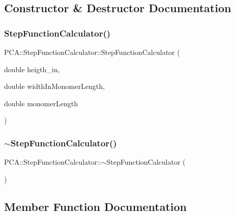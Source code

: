 \subsection{Constructor \& Destructor Documentation}
\hypertarget{class_p_c_a_1_1_step_function_calculator_a9bf57193b40bb2b8a33fd5a5878b0b2a}{}\label{class_p_c_a_1_1_step_function_calculator_a9bf57193b40bb2b8a33fd5a5878b0b2a} 
\subsubsection{\texorpdfstring{Step\+Function\+Calculator()}{StepFunctionCalculator()}}
{\footnotesize\ttfamily P\+C\+A\+::\+Step\+Function\+Calculator\+::\+Step\+Function\+Calculator (\begin{DoxyParamCaption}\item[{double}]{heigth\+\_\+in,  }\item[{double}]{width\+In\+Monomer\+Length,  }\item[{double}]{monomer\+Length }\end{DoxyParamCaption})}

\hypertarget{class_p_c_a_1_1_step_function_calculator_a8f3de89d75389034ca485219ce74275b}{}\label{class_p_c_a_1_1_step_function_calculator_a8f3de89d75389034ca485219ce74275b} 
\subsubsection{\texorpdfstring{$\sim$\+Step\+Function\+Calculator()}{~StepFunctionCalculator()}}
{\footnotesize\ttfamily P\+C\+A\+::\+Step\+Function\+Calculator\+::$\sim$\+Step\+Function\+Calculator (\begin{DoxyParamCaption}{ }\end{DoxyParamCaption})}



\subsection{Member Function Documentation}
\hypertarget{class_p_c_a_1_1_step_function_calculator_a0607e2f78b6b7c0ed40083f921b58fdc}{}\label{class_p_c_a_1_1_step_function_calculator_a0607e2f78b6b7c0ed40083f921b58fdc} 
